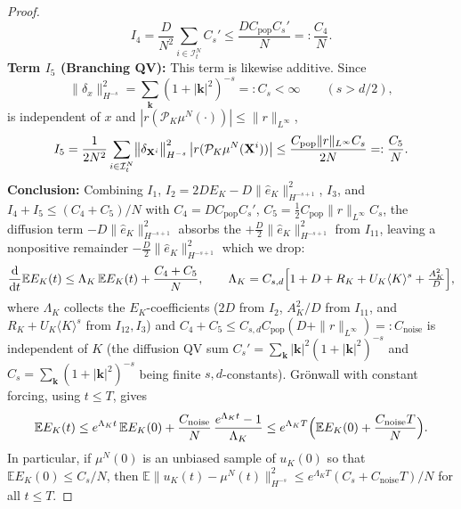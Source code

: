 \documentclass[a4paper,fleqn]{cas-sc}
\theoremstyle{definition}
\theoremstyle{remark}
\begin{document}
\begin{proof}
\begin{equation}
    I_4 = \frac{D}{N^2}\sum_{i\in \mathcal I^N_t}C_s'
    \le \frac{D C_{\mathrm{pop}} C_s'}{N}=:\frac{C_4}{N}.
\end{equation}
\textbf{Term $I_5$ (Branching QV):}
This term is likewise additive. Since
\[
\|\delta_x\|_{H^{-s}}^2=\sum_{\mathbf k}(1+|\mathbf k|^2)^{-s}=:C_s<\infty
\qquad(s>d/2),
\]
is independent of $x$ and $|r(\mathcal P_K\mu^N(\cdot))|\le\|r\|_{L^\infty}$,
\[
    I_5 = \frac{1}{2N^2}\sum_{i\in \mathcal I^N_t}
    \bigl\|\delta_{\mathbf{X}^i}\bigr\|_{H^{-s}}^2\,\bigl|r(\mathcal P_K\mu^N(\mathbf{X}^i))\bigr|
    \le \frac{C_{\mathrm{pop}} \|r\|_{L^\infty} C_s}{2N}=:\frac{C_5}{N}.
\]
\textbf{Conclusion:}
Combining $I_1$, $I_2=2DE_K-D\|\hat e_K\|_{H^{-s+1}}^2$, $I_3$, and
$I_4+I_5\le(C_4+C_5)/N$ with
$C_4=DC_{\mathrm{pop}}C_s'$, $C_5=\tfrac12C_{\mathrm{pop}}\|r\|_{L^\infty}C_s$, the diffusion term $-D\|\hat e_K\|_{H^{-s+1}}^2$
absorbs the $+\tfrac D2\|\hat e_K\|_{H^{-s+1}}^2$ from $I_{11}$, leaving a nonpositive
remainder $-\tfrac D2\|\hat e_K\|_{H^{-s+1}}^2$ which we drop:
\[
\frac{\mathrm{d}}{\mathrm{d} t}\mathbb{E}E_{K}(t)
\le \Lambda_K\,\mathbb{E}E_K(t) + \frac{C_4+C_5}{N},
\qquad
\Lambda_K=C_{s,d}\Bigl[1+D+R_K+U_K\langle K\rangle^{s}+\tfrac{A_K^2}{D}\Bigr],
\]
where $\Lambda_K$ collects the $E_K$-coefficients ($2D$ from $I_2$, $A_K^2/D$ from
$I_{11}$, and $R_K+U_K\langle K\rangle^{s}$ from $I_{12},I_3$) and
$C_4+C_5\le C_{s,d}C_{\mathrm{pop}}(D+\|r\|_{L^\infty})=:C_{\mathrm{noise}}$ is independent of $K$
(the diffusion QV sum $C_s'=\sum_{\mathbf k}|\mathbf k|^2(1+|\mathbf k|^2)^{-s}$ and
$C_s=\sum_{\mathbf k}(1+|\mathbf k|^2)^{-s}$ being finite $s,d$-constants). Gr\"onwall with
constant forcing, using $t\le T$, gives
\[
\mathbb E E_K(t)\le e^{\Lambda_K t}\,\mathbb E E_K(0)
+\frac{C_{\mathrm{noise}}}{N}\,\frac{e^{\Lambda_K t}-1}{\Lambda_K}
\le e^{\Lambda_K T}\Bigl(\mathbb E E_K(0)+\frac{C_{\mathrm{noise}}T}{N}\Bigr).
\]
In particular, if $\mu^N(0)$ is an unbiased sample of $u_K(0)$ so that
$\mathbb E E_K(0)\le C_s/N$, then
$\mathbb E\|u_K(t)-\mu^N(t)\|_{H^{-s}}^2\le e^{\Lambda_KT}(C_s+C_{\mathrm{noise}}T)/N$ for
all $t\le T$.
\end{proof}
\end{document}
